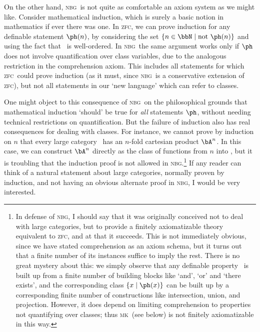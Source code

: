 \documentclass[12pt]{amsart}
\def\zfc{\textsc{zfc}}
\def\nbg{\textsc{nbg}}
\def\mk{\textsc{mk}}
\begin{document}
On the other hand, \nbg\ is not quite as comfortable an axiom system as
we might like.  Consider mathematical induction, which is surely a
basic notion in mathematics if ever there was one.  In \zfc, we can
prove induction for any definable statement $\ph(n)$, by considering
the set $\{n \in\bbN \mid \text{not } \ph(n)\}$ and using the fact
that \bbN\ is well-ordered.  In \nbg\ the same argument works only if
$\ph$ does not involve quantification over class variables, due to the
analogous restriction in the comprehension axiom.  This includes all
statements for which \zfc\ could prove induction (as it must, since \nbg\
is a conservative extension of \zfc), but not all statements in our
`new language' which can refer to classes.

One might object to this consequence of \nbg\ on the philosophical
grounds that mathematical induction `should' be true for \emph{all}
statements $\ph$, without needing technical restrictions on
quantification.  But the failure of induction also has real
consequences for dealing with classes.  For instance, we cannot prove
by induction on $n$ that every large category \bA\ has an $n$-fold
cartesian product $\bA^n$.  In this case, we can construct $\bA^n$
directly as the class of functions from $n$ into \bA, but it is
troubling that the induction proof is not allowed in \nbg.\footnote{In
  defense of \nbg, I should say that it was originally conceived not
  to deal with large categories, but to provide a finitely
  axiomatizable theory equivalent to \zfc, and at that it succeeds.
  This is not immediately obvious, since we have stated comprehension
  as an axiom schema, but it turns out that a finite number of its
  instances suffice to imply the rest.  There is no great mystery
  about this: we simply observe that any definable property \ph\ is
  built up from a finite number of building blocks like `and', `or'
  and `there exists', and the corresponding class $\{x\mid \ph(x)\}$
  can be built up by a corresponding finite number of constructions
  like intersection, union, and projection.  However, it does depend
  on limiting comprehension to properties not quantifying over
  classes; thus \mk\ (see below) is not finitely axiomatizable in this
  way.}  If any reader can think of a natural statement about large
categories, normally proven by induction, and not having an obvious
alternate proof in \nbg, I would be very interested.
\end{document}
